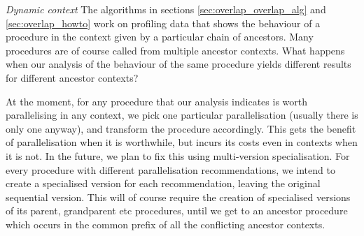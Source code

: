 


\emph{Dynamic context}
The algorithms in sections \ref{sec:overlap_overlap_alg}
and \ref{sec:overlap_howto}
work on profiling data that shows the behaviour of a procedure
in the context given by a particular chain of ancestors.
Many procedures are of course called from multiple ancestor contexts.
What happens when our analysis of the behaviour of the same procedure
yields different results for different ancestor contexts?

At the moment, for any procedure
that our analysis indicates is worth parallelising in any context,
we pick one particular parallelisation (usually there is only one anyway),
and transform the procedure accordingly.
This gets the benefit of parallelisation when it is worthwhile,
but incurs its costs even in contexts when it is not.
In the future, we plan to fix this using multi-version specialisation.
For every procedure with different parallelisation recommendations,
we intend to create a specialised version for each recommendation,
leaving the original sequential version.
This will of course require the creation of specialised versions
of its parent, grandparent etc procedures,
until we get to an ancestor procedure
which occurs in the common prefix of all the conflicting ancestor contexts.

%
%
%

